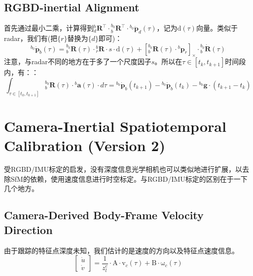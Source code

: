 \documentclass[12pt, onecolumn]{article}
\newcommand\liehat[1]{\left[ #1 \right]_\times}
\newcommand\bsm[1]{\boldsymbol{\mathrm{#1}}}
\begin{document}
	\subsection{RGBD-inertial Alignment}
	首先通过最小二乘，计算得到${^{b}_{d}\boldsymbol{R}^\top}\cdot{^{b_0}_{b}\boldsymbol{R}^\top}\cdot{^{b_0}\dot{\boldsymbol{p}}_d(\tau)}$，记为$\bsm{d}(\tau)$向量。类似于radar，我们有(把$\{r\}$替换为$\{d\}$即可)：
	\begin{equation}
	{^{b_0}\dot{\boldsymbol{p}}_b(\tau)}={^{b_0}_{b}\boldsymbol{R}}(\tau)\cdot{^{b}_{r}\boldsymbol{R}}\cdot s\cdot\bsm{d}(\tau)
	+\liehat{{^{b_0}_{b}\boldsymbol{R}(\tau)}\cdot{^{b}{\boldsymbol{p}}_r}}\cdot{^{b_0}_{b}\dot{\boldsymbol{R}}(\tau)}
	\end{equation}
	注意，与radar不同的地方在于多了一个尺度因子$s$。所以在$\tau\in[t_k,t_{k+1}]$时间段内，有：：
	\begin{equation}
	\int_{\tau\in[t_k,t_{k+1}]}{^{b_0}_{b}\boldsymbol{R}(\tau)}\cdot{^{b}\boldsymbol{a}(\tau)}\cdot d\tau=
	{^{b_0}\dot{\boldsymbol{p}}_b(t_{k+1})}-{^{b_0}\dot{\boldsymbol{p}}_b(t_k)}
	-{^{b_0}\boldsymbol{g}}\cdot (t_{k+1}-t_k)
	\end{equation}
	

	\section{Camera-Inertial Spatiotemporal Calibration (Version 2)}
	受RGBD/IMU标定的启发，没有深度信息光学相机也可以类似地进行扩展，以去除SfM的依赖，使用速度信息进行时空标定。与RGBD/IMU标定的区别在于一下几个地方。
	\subsection{Camera-Derived Body-Frame Velocity Direction}
	由于跟踪的特征点深度未知，我们估计的是速度的方向以及特征点速度信息。
	\begin{equation}
	\begin{bmatrix}
				\dot{u}\\\dot{v}
			\end{bmatrix}=\frac{1}{z_l^c}\cdot\bsm{A}\cdot\bsm{v}_c(\tau)+\bsm{B}\cdot\bsm{\omega}_c(\tau)
	\end{equation}
\end{document}
